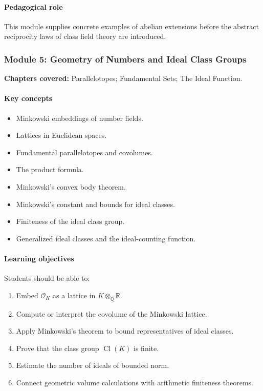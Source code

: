 \documentclass[11pt]{article}
\newcommand{\Q}{\mathbb{Q}}
\newcommand{\R}{\mathbb{R}}
\newcommand{\Cl}{\operatorname{Cl}}
\begin{document}
\paragraph{Pedagogical role}
This module supplies concrete examples of abelian extensions before the abstract reciprocity laws of class field theory are introduced.

\subsubsection*{Module 5: Geometry of Numbers and Ideal Class Groups}

\textbf{Chapters covered:} Parallelotopes; Fundamental Sets; The Ideal Function.

\paragraph{Key concepts}
\begin{itemize}
    \item Minkowski embeddings of number fields.
    \item Lattices in Euclidean spaces.
    \item Fundamental parallelotopes and covolumes.
    \item The product formula.
    \item Minkowski's convex body theorem.
    \item Minkowski's constant and bounds for ideal classes.
    \item Finiteness of the ideal class group.
    \item Generalized ideal classes and the ideal-counting function.
\end{itemize}

\paragraph{Learning objectives}
Students should be able to:
\begin{enumerate}
    \item Embed $\mathcal{O}_K$ as a lattice in $K\otimes_{\Q}\R$.
    \item Compute or interpret the covolume of the Minkowski lattice.
    \item Apply Minkowski's theorem to bound representatives of ideal classes.
    \item Prove that the class group $\Cl(K)$ is finite.
    \item Estimate the number of ideals of bounded norm.
    \item Connect geometric volume calculations with arithmetic finiteness theorems.
\end{enumerate}
\end{document}
